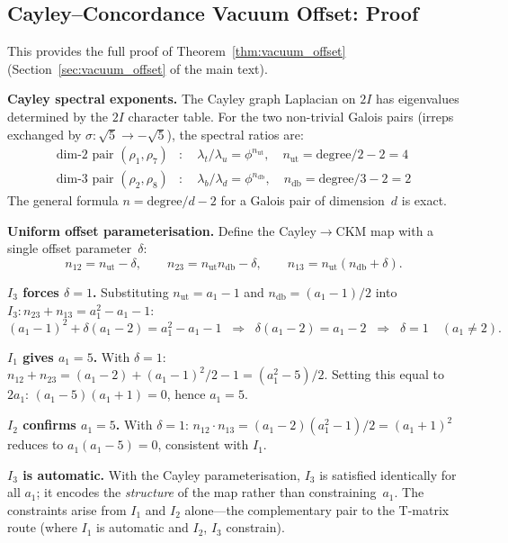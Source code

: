 \documentclass[12pt,a4paper]{article}
\theoremstyle{definition}
\begin{document}
\subsection{Cayley--Concordance Vacuum Offset: Proof}
\label{sec:S-vacuum-offset}

This provides the full proof of Theorem~\ref{thm:vacuum_offset} (Section~\ref{sec:vacuum_offset} of the main text).

\textbf{Cayley spectral exponents.}  The Cayley graph Laplacian on $2I$ has eigenvalues determined by the $2I$ character table.  For the two non-trivial Galois pairs (irreps exchanged by $\sigma\colon \sqrt{5} \to -\sqrt{5}$), the spectral ratios are:
\begin{align}
\text{dim-2 pair } (\rho_1, \rho_7)&\colon \quad \lambda_t / \lambda_u = \phi^{n_{\text{ut}}}, \quad n_{\text{ut}} = \text{degree}/2 - 2 = 4 \\
\text{dim-3 pair } (\rho_2, \rho_8)&\colon \quad \lambda_b / \lambda_d = \phi^{n_{\text{db}}}, \quad n_{\text{db}} = \text{degree}/3 - 2 = 2
\end{align}
The general formula $n = \text{degree}/d - 2$ for a Galois pair of dimension~$d$ is exact.

\textbf{Uniform offset parameterisation.}  Define the Cayley$\to$CKM map with a single offset parameter~$\delta$:
\[
n_{12} = n_{\text{ut}} - \delta, \qquad n_{23} = n_{\text{ut}} n_{\text{db}} - \delta, \qquad n_{13} = n_{\text{ut}}(n_{\text{db}} + \delta).
\]

\textbf{$I_3$ forces $\delta = 1$.}  Substituting $n_{\text{ut}} = a_1 - 1$ and $n_{\text{db}} = (a_1-1)/2$ into $I_3\colon n_{23} + n_{13} = a_1^2 - a_1 - 1$:
\[
(a_1-1)^2 + \delta(a_1-2) = a_1^2 - a_1 - 1 \;\;\Longrightarrow\;\; \delta(a_1-2) = a_1-2 \;\;\Longrightarrow\;\; \delta = 1 \quad (a_1 \neq 2).
\]

\textbf{$I_1$ gives $a_1 = 5$.}  With $\delta = 1$: $n_{12} + n_{23} = (a_1-2) + (a_1-1)^2/2 - 1 = (a_1^2 - 5)/2$.  Setting this equal to $2a_1$: $(a_1-5)(a_1+1) = 0$, hence $a_1 = 5$.

\textbf{$I_2$ confirms $a_1 = 5$.}  With $\delta = 1$: $n_{12} \cdot n_{13} = (a_1-2)(a_1^2-1)/2 = (a_1+1)^2$ reduces to $a_1(a_1-5) = 0$, consistent with $I_1$.

\textbf{$I_3$ is automatic.}  With the Cayley parameterisation, $I_3$ is satisfied identically for all $a_1$; it encodes the \emph{structure} of the map rather than constraining~$a_1$.  The constraints arise from $I_1$ and $I_2$ alone---the complementary pair to the T-matrix route (where $I_1$ is automatic and $I_2$, $I_3$ constrain).
\end{document}

